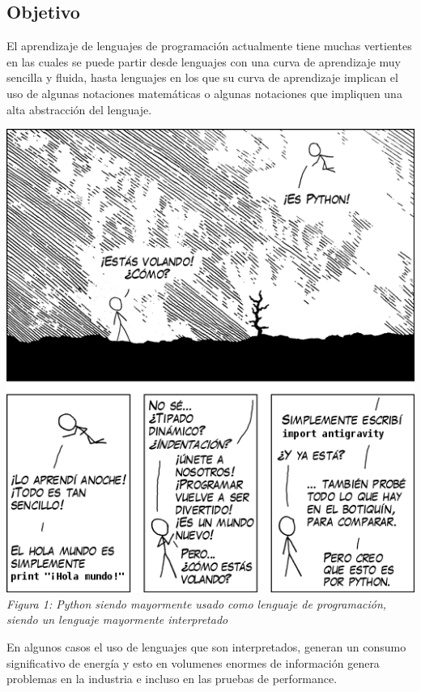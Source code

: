 \documentclass[10pt,executivepaper]{article}
\begin{document}
\subsection{Objetivo}
El aprendizaje de lenguajes de programación actualmente tiene muchas vertientes en las cuales se puede partir desde lenguajes con una curva de aprendizaje muy sencilla y fluida, hasta lenguajes en los que su curva de aprendizaje implican el uso de algunas notaciones matemáticas o algunas notaciones que impliquen una alta abstracción del lenguaje.
\begin{center}
  \includegraphics[scale=0.7]{imgs/python.png}
  \\\textit{Figura 1: Python siendo mayormente usado como lenguaje de programación, siendo un lenguaje mayormente interpretado}\\
\end{center}
En algunos casos el uso de lenguajes que son interpretados, generan un consumo significativo de energía y esto en volumenes enormes de información genera problemas en la industria e incluso en las pruebas de performance.
\end{document}
